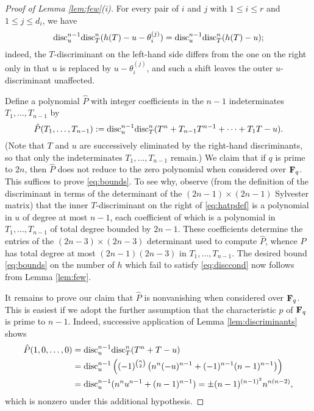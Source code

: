 \documentclass[a4paper]{compositio}
\begin{document}
\begin{proof}[Proof of Lemma \ref{lem:few}(i)] For every pair of $i$ and $j$
with $1 \leq i \leq r$ and $1 \leq j \leq d_i$,  we have
\begin{equation}\label{eq:multex}
\mathrm{disc}_u^{n-1}\mathrm{disc}_{T}^n (h(T)-u - \theta_i^{(j)}) =
\mathrm{disc}_u^{n-1}\mathrm{disc}_{T}^n (h(T)-u);
\end{equation}
indeed, the $T$-discriminant on the left-hand side differs from the
one on the right only in that $u$ is replaced by $u-\theta_i^{(j)}$,
and such a shift leaves the outer $u$-discriminant unaffected.

Define a polynomial $\hat{P}$ with integer coefficients in the $n-1$
indeterminates $T_1, \dots, T_{n-1}$ by
\begin{equation}\label{eq:hatpdef}
\hat{P}(T_1, \dots, T_{n-1}) := \mathrm{disc}_u^{n-1} \mathrm{disc}_T^{n}(T^n + T_{n-1} T^{n-1} + \dots + T_{1} T
-u).
\end{equation}
(Note that $T$ and $u$ are successively eliminated by the right-hand
discriminants, so that only the indeterminates $T_1, \dots, T_{n-1}$
remain.) We claim that if $q$ is prime to $2n$, then $\hat{P}$ does
not reduce to the zero polynomial when considered over $\mathbf{F}_q$. This
suffices to prove \eqref{eq:bounds}. To see why, observe (from the
definition of the discriminant in terms of the determinant of the
$(2n-1)\times (2n-1)$ Sylvester matrix) that the inner
$T$-discriminant on the right of \eqref{eq:hatpdef} is a polynomial
in $u$ of degree at most $n-1$, each coefficient of which is a
polynomial in $T_1, \dots, T_{n-1}$ of total degree bounded by
$2n-1$. These coefficients determine the entries of the $(2n-3)
\times (2n-3)$ determinant used to compute $\hat{P}$, whence
$\hat{P}$ has total degree at most $(2n-1)(2n-3)$ in $T_1, \dots,
T_{n-1}$. The desired bound \eqref{eq:bounds} on the number of $h$
which fail to satisfy \eqref{eq:disccond} now follows from Lemma
\ref{lem:few}.

It remains to prove our claim that $\hat{P}$ is nonvanishing when
considered over $\mathbf{F}_q$. This is easiest if we adopt the further
assumption that the characteristic $p$ of $\mathbf{F}_q$ is prime to $n-1$.
Indeed, successive application of Lemma \ref{lem:discriminants}
shows
\begin{align*}
 \hat{P}(1,0,\dots,0) &= \mathrm{disc}_u^{n-1} \mathrm{disc}_T^{n}(T^n +T-u) \\
 &= \mathrm{disc}_u^{n-1} \left((-1)^{\binom{n}{2}}\left(n^n (-u)^{n-1} + (-1)^{n-1}(n-1)^{n-1}\right)\right) \\
 &= \mathrm{disc}_u^{n-1} (n^n u^{n-1} + (n-1)^{n-1}) = \pm
 (n-1)^{(n-1)^2} n^{n(n-2)},
\end{align*}
which is nonzero under this additional hypothesis.


\end{proof}
\end{document}
